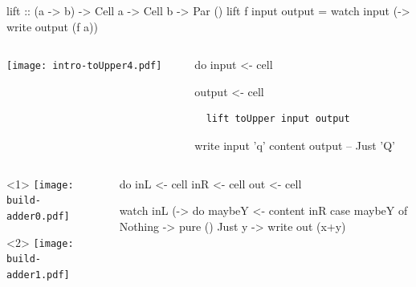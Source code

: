 \documentclass[UKenglish,usenames,dvipsnames,svgnames,table,aspectratio=169,mathserif]{beamer}
\newcommand{\nl}{\vspace{\baselineskip}}
\newcommand{\pnl}{\pause \nl}
\begin{document}
\begin{frame}[fragile]
\begin{haskellcode}
          lift :: (a -> b) -> Cell a -> Cell b -> Par ()
          lift f input output =
            watch input (\a ->
              write output (f a))
\end{haskellcode}
\end{frame}


\begin{frame}[fragile]
\centering

\begin{columns}
\begin{column}{0.5\textwidth}
\begin{overlayarea}{0.5\textwidth}{0.4\textheight}
\texttt{[image: intro-toUpper4.pdf]}
\end{overlayarea}
\end{column}
\begin{column}{0.5\textwidth}
\begin{haskellcode}
do
  input  <- cell
\end{haskellcode}
\begin{haskellcode}
  output <- cell
\end{haskellcode}
\begin{verbatim}
  lift toUpper input output
\end{verbatim}
\nl
\begin{haskellcode}
  write input 'q'
  content output   -- Just 'Q'
\end{haskellcode}
\end{column}
\end{columns}

\end{frame}


\begin{frame}[fragile]
\centering


\begin{columns}
\begin{column}{0.5\textwidth}
\begin{overlayarea}{0.5\textwidth}{0.4\textheight}
\begin{onlyenv}<1>
\texttt{[image: build-adder0.pdf]}
\end{onlyenv}
\begin{onlyenv}<2>
\texttt{[image: build-adder1.pdf]}
\end{onlyenv}
\end{overlayarea}
\end{column}
\begin{column}{0.5\textwidth}
\begin{haskellcode}
do
  inL  <- cell
  inR  <- cell
  out  <- cell
\end{haskellcode}
\pnl
\begin{haskellcode}
  watch inL (\x -> do
    maybeY <- content inR
    case maybeY of
      Nothing -> pure ()
      Just y  -> write out (x+y)
\end{haskellcode}
\end{column}
\end{columns}
\end{frame}
\end{document}
